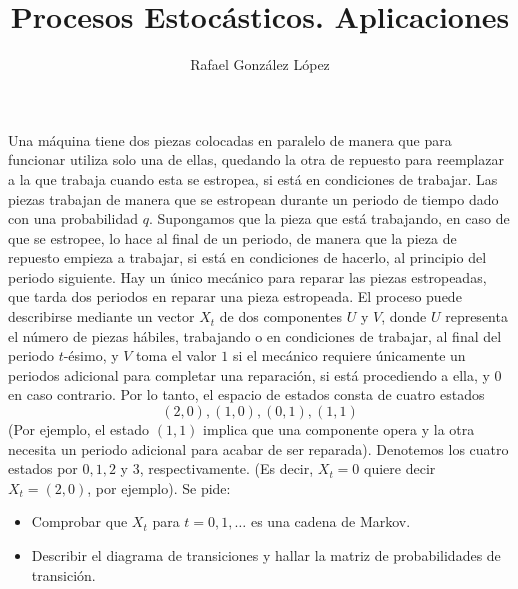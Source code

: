 \documentclass[twoside]{article}
\begin{document}
\title{Procesos Estocásticos. Aplicaciones}
\author{Rafael González López}
\maketitle

\begin{ejercicio}{6}
Una máquina tiene dos piezas colocadas en paralelo de manera que para funcionar utiliza solo una de ellas, quedando la otra de repuesto para reemplazar a la que trabaja cuando esta se estropea, si está en condiciones de trabajar. Las piezas trabajan de manera que se estropean durante un periodo de tiempo dado con una probabilidad $q$. Supongamos que la pieza que está trabajando, en caso de que se estropee, lo hace al final de un periodo, de manera que la pieza de repuesto empieza a trabajar, si está en condiciones de hacerlo, al principio del periodo siguiente. Hay un único mecánico para reparar las piezas estropeadas, que tarda dos periodos en reparar una pieza estropeada. El proceso puede describirse mediante un vector $X_t$ de dos componentes $U$ y $V$, donde $U$ representa el número de piezas hábiles, trabajando o en condiciones de trabajar, al final del periodo $t$-ésimo, y $V$ toma el valor $1$ si el mecánico requiere únicamente un periodos adicional para completar una reparación, si está procediendo a ella, y $0$ en caso contrario. Por lo tanto, el espacio de estados consta de cuatro estados
$$
(2,0), (1,0),(0,1),(1,1)
$$
(Por ejemplo, el estado $(1,1)$ implica que una componente opera y la otra necesita un periodo adicional para acabar de ser reparada). Denotemos los cuatro estados por $0,1,2$ y $3$, respectivamente. (Es decir, $X_t=0$ quiere decir $X_t = (2,0)$, por ejemplo). Se pide:
\begin{itemize}
\item Comprobar que $X_t$ para $t=0,1,\dotsc$ es una cadena de Markov.
\item Describir el diagrama de transiciones y hallar la matriz de probabilidades de transición. 
\end{itemize} 
\end{ejercicio}
\end{document}
